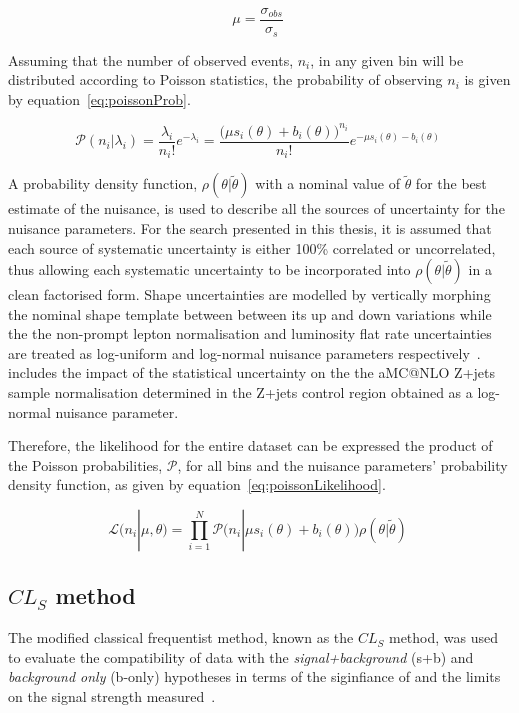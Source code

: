 \begin{equation}
\mu = \frac{\sigma_{obs}}{\sigma_{s}}  \;
\label{eq:signalModifier}
\end{equation}

Assuming that the number of observed events, $n_{i}$, in any given bin will be distributed according to Poisson statistics, the probability of observing $n_{i}$ is given by equation~\ref{eq:poissonProb}.

\begin{equation}
\mathcal{P} ( n_{i} | \lambda_{i} ) = \frac{\lambda_{i}}{n_{i}!} e^{- \lambda_{i}} = \frac{ \big( \mu s_{i}(\theta) + b_{i}(\theta) \big)^{n_{i}}}{n_{i} !} e^{- \mu s_{i}(\theta) - b_{i}(\theta)}  \;
\label{eq:poissonProb}
\end{equation}

A probability density function, $\rho ( \theta | \tilde{\theta} )$ with a nominal value of $\tilde{\theta}$ for the best estimate of the nuisance, is used to describe all the sources of uncertainty for the nuisance parameters.
For the search presented in this thesis, it is assumed that each source of systematic uncertainty is either 100\% correlated or uncorrelated, thus allowing each systematic uncertainty to be incorporated into $\rho ( \theta | \tilde{\theta} )$ in a clean factorised form.
Shape uncertainties are modelled by vertically morphing the nominal shape template between between its up and down variations while the the non-prompt lepton normalisation and luminosity flat rate uncertainties are treated as log-uniform and log-normal nuisance parameters respectively~\cite{Baak:2014fta,AsymptoticFormulae}.
\combine includes the impact of the statistical uncertainty on the the aMC@NLO Z+jets sample normalisation determined in the Z+jets control region obtained as a log-normal nuisance parameter.

Therefore, the likelihood for the entire dataset can be expressed the product of the Poisson probabilities, $\mathcal{P}$, for all bins and the nuisance parameters' probability density function, as given by equation~\ref{eq:poissonLikelihood}.

\begin{equation}
\mathcal{L} ( n_{i} | \mu , \theta ) = 
\prod_{i=1}^{N} \mathcal{P} \big( n_{i} | \mu s_{i}(\theta) + b_{i}(\theta) \big) \rho ( \theta | \tilde{\theta} ) \;
\label{eq:poissonLikelihood}
\end{equation}

\subsection{$CL_{S}$ method}\label{subsec:CLsMethod}
The modified classical frequentist method, known as the $CL_{S}$ method, was used to evaluate the compatibility of data with the \emph{signal+background} (s+b) and \emph{background only} (b-only) hypotheses in terms of the siginfiance of and the limits on the signal strength measured~\cite{Cowan:2010js}.

